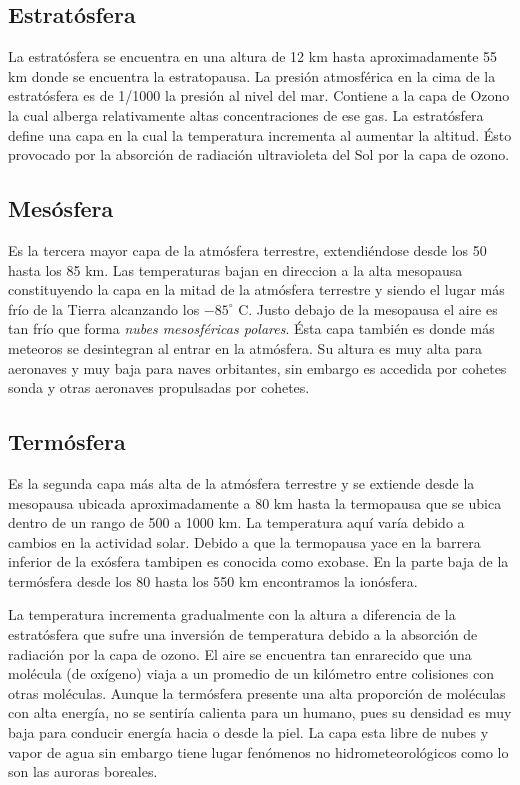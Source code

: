 \documentclass{article}
\begin{document}
\subsection{Estratósfera}
La estratósfera se encuentra en una altura de 12 km hasta aproximadamente 55 km donde se encuentra la estratopausa. La presión atmosférica en la cima de la estratósfera es de 1/1000 la presión al nivel del mar. Contiene a la capa de Ozono la cual alberga relativamente altas concentraciones de ese gas. La estratósfera define una capa en la cual la temperatura incrementa al aumentar la altitud. Ésto provocado por la absorción de radiación ultravioleta del Sol por la capa de ozono.
\subsection{Mesósfera}
Es la tercera mayor capa de la atmósfera terrestre, extendiéndose desde los 50 hasta los 85 km. Las temperaturas bajan en direccion a la alta mesopausa constituyendo la capa en la mitad de la atmósfera terrestre y siendo el lugar más frío de la Tierra alcanzando los $-85^\circ$ C.
Justo debajo de la mesopausa el aire es tan frío que forma \textit{nubes mesosféricas polares}. Ésta capa también es donde más meteoros se desintegran al entrar en la atmósfera. Su altura es muy alta para aeronaves y muy baja para naves orbitantes, sin embargo es accedida por cohetes sonda y otras aeronaves propulsadas por cohetes.
\subsection{Termósfera}
Es la segunda capa más alta de la atmósfera terrestre y se extiende desde la mesopausa ubicada aproximadamente a 80 km hasta la termopausa que se ubica dentro de un rango de 500 a 1000 km. La temperatura aquí varía debido a cambios en la actividad solar. Debido a que la termopausa yace en la barrera inferior de la exósfera tambipen es conocida como exobase. En la parte baja de la termósfera desde los 80 hasta los 550 km encontramos la ionósfera.

La temperatura incrementa gradualmente con la altura a diferencia de la estratósfera que sufre una inversión de temperatura debido a la absorción de radiación por la capa de ozono. El aire se encuentra tan enrarecido que una molécula (de oxígeno) viaja a un promedio de un kilómetro entre colisiones con otras moléculas. Aunque la termósfera presente una alta proporción de moléculas con alta energía, no se sentiría calienta para un humano, pues su densidad es muy baja para conducir energía hacia o desde la piel.
La capa esta libre de nubes y vapor de agua sin embargo tiene lugar fenómenos no hidrometeorológicos como lo son las auroras boreales.
\end{document}
